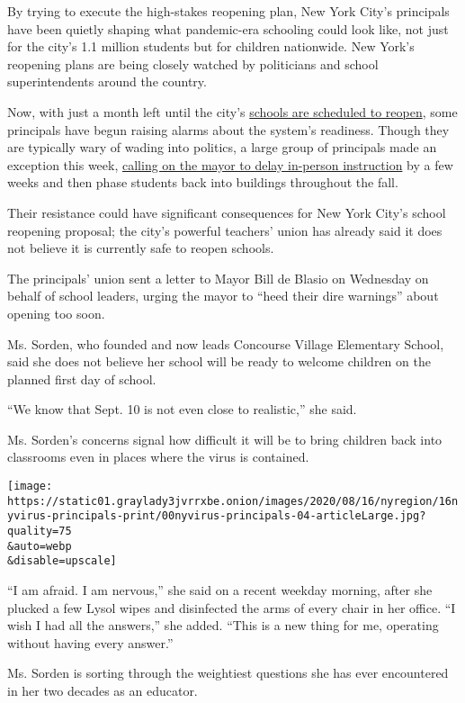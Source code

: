 By trying to execute the high-stakes reopening plan, New York City's
principals have been quietly shaping what pandemic-era schooling could
look like, not just for the city's 1.1 million students but for children
nationwide. New York's reopening plans are being closely watched by
politicians and school superintendents around the country.

Now, with just a month left until the city's
\href{https://www.nytimes3xbfgragh.onion/2020/08/18/nyregion/schools-reopen-nyc.html}{schools
are scheduled to reopen}, some principals have begun raising alarms
about the system's readiness. Though they are typically wary of wading
into politics, a large group of principals made an exception this week,
\href{https://twitter.com/MOREcaucusUFT/status/1293258831041110017}{calling
on the mayor to delay in-person instruction} by a few weeks and then
phase students back into buildings throughout the fall.

Their resistance could have significant consequences for New York City's
school reopening proposal; the city's powerful teachers' union has
already said it does not believe it is currently safe to reopen schools.

The principals' union sent a letter to Mayor Bill de Blasio on Wednesday
on behalf of school leaders, urging the mayor to ``heed their dire
warnings'' about opening too soon.

Ms. Sorden, who founded and now leads Concourse Village Elementary
School, said she does not believe her school will be ready to welcome
children on the planned first day of school.

``We know that Sept. 10 is not even close to realistic,'' she said.

Ms. Sorden's concerns signal how difficult it will be to bring children
back into classrooms even in places where the virus is contained.

\texttt{[image: https://static01.graylady3jvrrxbe.onion/images/2020/08/16/nyregion/16nyvirus-principals-print/00nyvirus-principals-04-articleLarge.jpg?quality=75\\\&auto=webp\\\&disable=upscale]}

``I am afraid. I am nervous,'' she said on a recent weekday morning,
after she plucked a few Lysol wipes and disinfected the arms of every
chair in her office. ``I wish I had all the answers,'' she added. ``This
is a new thing for me, operating without having every answer.''

Ms. Sorden is sorting through the weightiest questions she has ever
encountered in her two decades as an educator.

